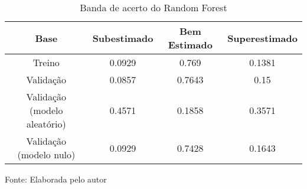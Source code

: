 
\begin{table}[h]
\centering
\caption{Banda de acerto do Random Forest}
\label{tab:cap3_band_random_forest}
\begin{tabular}{cccc}
Base & Subestimado & Bem Estimado & Superestimado \\
\hline
Treino & 0.0929 & 0.769 & 0.1381 \\
Validação & 0.0857 & 0.7643 & 0.15 \\
Validação (modelo aleatório) & 0.4571 & 0.1858 & 0.3571 \\
Validação (modelo nulo) & 0.0929 & 0.7428 & 0.1643 \\
\hline
\end{tabular}

Fonte: Elaborada pelo autor
\end{table}
